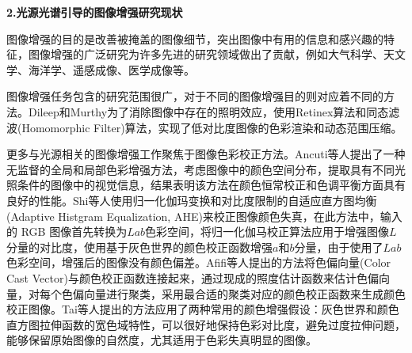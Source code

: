 \documentclass[
    type = master, %
    degree = academic,        %
    decl-page,  %
  ]{njuthesis}
\begin{document}




\textbf{2.光源光谱引导的图像增强研究现状}

图像增强的目的是改善被掩盖的图像细节，突出图像中有用的信息和感兴趣的特征\cite{liu2022survey}，图像增强的广泛研究为许多先进的研究领域做出了贡献\cite{IE3}，例如大气科学、天文学、海洋学、遥感成像、医学成像等。

图像增强任务包含的研究范围很广，对于不同的图像增强目的则对应着不同的方法。Dileep和Murthy\cite{IE14}为了消除图像中存在的照明效应，使用Retinex算法和同态滤波(Homomorphic Filter)算法，实现了低对比度图像的色彩渲染和动态范围压缩。

更多与光源相关的图像增强工作聚焦于图像色彩校正方法。Ancuti等人\cite{IE108}提出了一种无监督的全局和局部色彩增强方法，考虑图像中的颜色空间分布，提取具有不同光照条件的图像中的视觉信息，结果表明该方法在颜色恒常校正和色调平衡方面具有良好的性能。Shi等人\cite{IE111}使用归一化伽玛变换和对比度限制的自适应直方图均衡(Adaptive Histgram Equalization, AHE)来校正图像颜色失真，在此方法中，输入的 RGB 图像首先转换为$Lab$色彩空间，将归一化伽马校正算法应用于增强图像$L$分量的对比度，使用基于灰色世界的颜色校正函数增强$a$和$b$分量，由于使用了$Lab$色彩空间，增强后的图像没有颜色偏差。Afifi等人\cite{IE112}提出的方法将色偏向量(Color Cast Vector)与颜色校正函数连接起来，通过现成的照度估计函数来估计色偏向量，对每个色偏向量进行聚类，采用最合适的聚类对应的颜色校正函数来生成颜色校正图像。Tai等人\cite{IE106}提出的方法应用了两种常用的颜色增强假设：灰色世界和颜色直方图拉伸函数的宽色域特性，可以很好地保持色彩对比度，避免过度拉伸问题，能够保留原始图像的自然度，尤其适用于色彩失真明显的图像。
\end{document}
